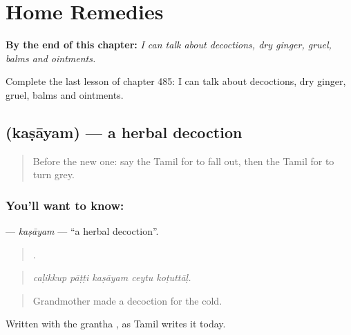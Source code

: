 
\chapter{Home Remedies}
\label{ch:ta-home-remedies}

\begin{chapteropening}
\textbf{By the end of this chapter:} \emph{I can talk about decoctions, dry ginger, gruel, balms and ointments.}

Complete the last lesson of chapter 485: I can talk about decoctions, dry ginger, gruel, balms and ointments.
\end{chapteropening}

\section[\texorpdfstring{\ta{கஷாயம்} (kaṣāyam)}{கஷாயம் (kaṣāyam)}]{ (kaṣāyam) — a herbal decoction}

\label{lesson:TA-C485-kasayam}



\begin{quote}
Before the new one: say the Tamil for to fall out, then the Tamil for to turn grey.
\end{quote}

\subsection*{You'll want to know: }
\textbf{} — \emph{kaṣāyam} — \textquotedblleft{}a herbal decoction\textquotedblright{}.

\begin{quote}
    .
\end{quote}

\begin{quote}
\emph{caḷikkup pāṭṭi kaṣāyam ceytu koṭuttāḷ.}
\end{quote}

\begin{quote}
Grandmother made a decoction for the cold.
\end{quote}

Written with the grantha , as Tamil writes it today.

